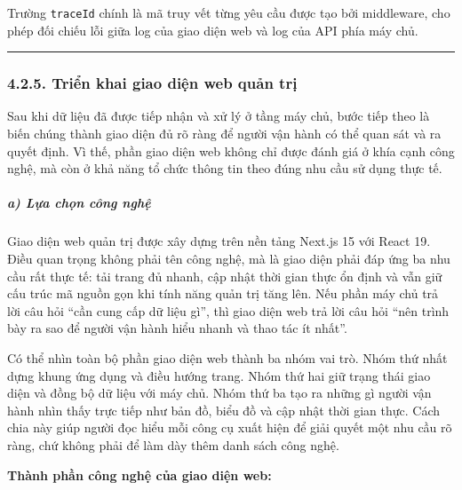 \documentclass[a4paper]{extarticle}
\begin{document}
Trường \texttt{traceId} chính là mã truy vết từng yêu cầu được tạo bởi
middleware, cho phép đối chiếu lỗi giữa log của giao diện web và log của API phía máy chủ.

\begin{center}\rule{0.5\linewidth}{0.5pt}\end{center}

\subsubsection{4.2.5. Triển khai giao diện web quản trị}\label{425-triux1ec3n-khai-frontend-dashboard-frontend-dashboard-implementation}

Sau khi dữ liệu đã được tiếp nhận và xử lý ở tầng máy chủ, bước tiếp
theo là biến chúng thành giao diện đủ rõ ràng để người vận hành có thể
quan sát và ra quyết định. Vì thế, phần giao diện web không chỉ được
đánh giá ở khía cạnh công nghệ, mà còn ở khả năng tổ chức thông tin theo
đúng nhu cầu sử dụng thực tế.

\subparagraph{a) Lựa chọn công
nghệ}\label{a-lux1ef1a-chux1ecdn-cuxf4ng-nghux1ec7-2}

Giao diện web quản trị được xây dựng trên nền tảng Next.js 15 với React 19.
Điều quan trọng không phải tên công nghệ, mà là giao diện phải đáp ứng ba
nhu cầu rất thực tế: tải trang đủ nhanh, cập nhật thời gian thực ổn định
và vẫn giữ cấu trúc mã nguồn gọn khi tính năng quản trị tăng lên. Nếu
phần máy chủ trả lời câu hỏi ``cần cung cấp dữ liệu gì'', thì giao diện
web trả lời câu hỏi ``nên trình bày ra sao để người vận hành hiểu nhanh
và thao tác ít nhất''.

Có thể nhìn toàn bộ phần giao diện web thành ba nhóm vai trò. Nhóm thứ
nhất dựng khung ứng dụng và điều hướng trang. Nhóm thứ hai giữ trạng
thái giao diện và đồng bộ dữ liệu với máy chủ. Nhóm thứ ba tạo ra những
gì người vận hành nhìn thấy trực tiếp như bản đồ, biểu đồ và cập nhật
thời gian thực. Cách chia này giúp người đọc hiểu mỗi công cụ xuất hiện
để giải quyết một nhu cầu rõ ràng, chứ không phải để làm dày thêm danh
sách công nghệ.

\textbf{Thành phần công nghệ của giao diện web:}
\end{document}
